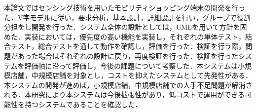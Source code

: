 
本論文ではセンシング技術を用いたモビリティショッピング端末の開発を行った．V字モデルに従い，要求分析，基本設計，詳細設計を行い，グループで役割分担をし開発を行った．システム全体の設計としては，UMLを用いて方針を固めた．実装においては，優先度の高い機能を実装し，それぞれの単体テスト，結合テスト，総合テストを通して動作を確認し，評価を行った．検証を行う際，問題があった場合はそれぞれの設計に戻り，再度検証を行った．検証を行ったシステムを評価軸に沿って評価し，今後の課題について考察した．本システムは小規模店舗，中規模店舗を対象とし，コストを抑えたシステムとして先発性がある．本システムの開発が進めば，小規模店舗，中規模店舗での人手不足問題が解消される．本研究により本システムは今後拡張性があり，低コストで運用ができる可能性を持つシステムであることを確認した．
